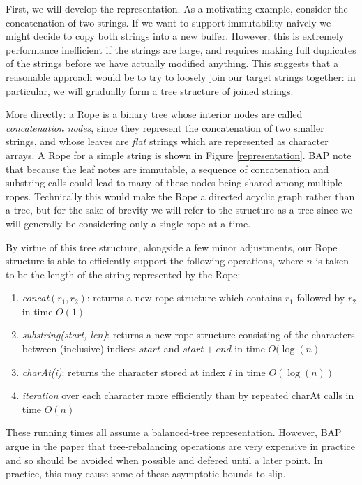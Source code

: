 \documentclass[12pt]{article}
\begin{document}
First, we will develop the representation. As a motivating example, consider the concatenation of two strings. If we want to support immutability naively we might decide to copy both strings into a new buffer. However, this is extremely performance inefficient if the strings are large, and requires making full duplicates of the strings before we have actually modified anything. This suggests that a reasonable approach would be to try to loosely join our target strings together: in particular, we will gradually form a tree structure of joined strings.

More directly: a Rope is a binary tree whose interior nodes are called \emph{concatenation nodes}, since they represent the concatenation of two smaller strings, and whose leaves are \emph{flat} strings which are represented as character arrays. A Rope for a simple string is shown in Figure \ref{representation}. BAP note that because the leaf notes are immutable, a sequence of concatenation and substring calls could lead to many of these nodes being shared among multiple ropes. Technically this would make the Rope a directed acyclic graph rather than a tree, but for the sake of brevity we will refer to the structure as a tree since we will generally be considering only a single rope at a time.

By virtue of this tree structure, alongside a few minor adjustments, our Rope structure is able to efficiently support the following operations, where $n$ is taken to be the length of the string represented by the Rope:

\begin{enumerate}
\item \emph{concat$(r_1, r_2)$}: returns a new rope structure which contains $r_1$ followed by $r_2$ in time $O(1)$
\item \emph{substring(start, len)}: returns a new rope structure consisting of the characters between (inclusive) indices $start$ and $start + end$ in time $O(\log(n)$
\item \emph{charAt(i)}: returns the character stored at index $i$ in time $O(\log(n))$
\item \emph{iteration} over each character more efficiently than by repeated charAt calls in time $O(n)$
\end{enumerate}

These running times all assume a balanced-tree representation. However, BAP argue in the paper that tree-rebalancing operations are very expensive in practice and so should be avoided when possible and defered until a later point. In practice, this may cause some of these asymptotic bounds to slip.
\end{document}
